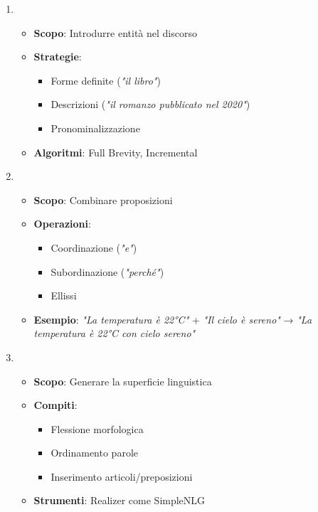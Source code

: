 \begin{enumerate}
\item {}
\begin{itemize}
    \item \textbf{Scopo}: Introdurre entità nel discorso
    \item \textbf{Strategie}:
    \begin{itemize}
        \item Forme definite (\textit{"il libro"})
        \item Descrizioni (\textit{"il romanzo pubblicato nel 2020"})
        \item Pronominalizzazione
    \end{itemize}
    \item \textbf{Algoritmi}: Full Brevity, Incremental
\end{itemize}

\item {}
\begin{itemize}
    \item \textbf{Scopo}: Combinare proposizioni
    \item \textbf{Operazioni}:
    \begin{itemize}
        \item Coordinazione (\textit{"e"})
        \item Subordinazione (\textit{"perché"})
        \item Ellissi
    \end{itemize}
    \item \textbf{Esempio}: \textit{"La temperatura è 22°C"} + \textit{"Il cielo è sereno"} → \textit{"La temperatura è 22°C con cielo sereno"}
\end{itemize}

\item {}
\begin{itemize}
    \item \textbf{Scopo}: Generare la superficie linguistica
    \item \textbf{Compiti}:
    \begin{itemize}
        \item Flessione morfologica
        \item Ordinamento parole
        \item Inserimento articoli/preposizioni
    \end{itemize}
    \item \textbf{Strumenti}: Realizer come SimpleNLG
\end{itemize}
\end{enumerate}

